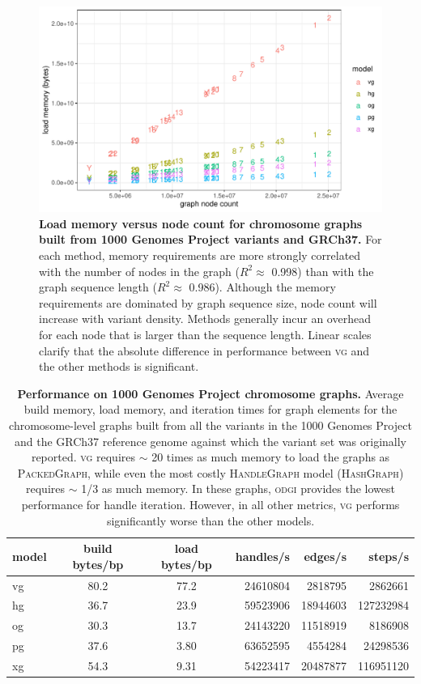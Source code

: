\documentclass{article}
\begin{document}
\begin{figure}[p]
  \centering
  \includegraphics[width=1.0\textwidth]{figures/1000gp_chroms_node_count.pdf}
  \caption{
    \label{fig:1000GPchroms}
    \textbf{Load memory versus node count for chromosome graphs built from 1000 Genomes Project variants and GRCh37.}
    For each method, memory requirements are more strongly correlated with the number of nodes in the graph ($R^2 \approx$ 0.998) than with the graph sequence length ($R^2 \approx$ 0.986).
    Although the memory requirements are dominated by graph sequence size, node count will increase with variant density.
    Methods generally incur an overhead for each node that is larger than the sequence length.
    Linear scales clarify that the absolute difference in performance between \textsc{vg} and the other methods is significant.
    }
\end{figure}

\begin{table}
  \centering
\begin{tabular}{l||c|c|r|r|r}
model & build bytes/bp & load bytes/bp & handles/s & edges/s & steps/s \\
\hline
vg &   80.2 &   77.2  &   24610804 &    2818795 &     2862661 \\
hg &   36.7 &   23.9  &   59523906 &   18944603 &   127232984 \\
og &   30.3 &   13.7  &   24143220 &   11518919 &     8186908 \\
pg &   37.6 &   3.80  &   63652595 &    4554284 &    24298536 \\
xg &   54.3 &   9.31  &   54223417 &   20487877 &   116951120 \\
\hline
\end{tabular}
\caption{
  \textbf{Performance on 1000 Genomes Project chromosome graphs.}
  Average build memory, load memory, and iteration times for graph elements for the chromosome-level graphs built from all the variants in the 1000 Genomes Project and the GRCh37 reference genome against which the variant set was originally reported.
  \textsc{vg} requires $\sim$ 20 times as much memory to load the graphs as \textsc{PackedGraph}, while even the most costly \textsc{HandleGraph} model (\textsc{HashGraph}) requires $\sim$ 1/3 as much memory.
  In these graphs, \textsc{odgi} provides the lowest performance for handle iteration.
  However, in all other metrics, \textsc{vg} performs significantly worse than the other models.
}
\label{table:1000GPchroms}
\end{table}
\end{document}
